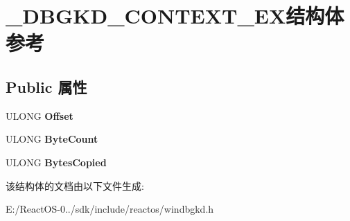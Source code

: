 \hypertarget{struct___d_b_g_k_d___c_o_n_t_e_x_t___e_x}{}\section{\+\_\+\+D\+B\+G\+K\+D\+\_\+\+C\+O\+N\+T\+E\+X\+T\+\_\+\+E\+X结构体 参考}
\label{struct___d_b_g_k_d___c_o_n_t_e_x_t___e_x}
\subsection*{Public 属性}
\begin{DoxyCompactItemize}
\item 
\mbox{\label{struct___d_b_g_k_d___c_o_n_t_e_x_t___e_x_a768a602dd8ec1f9da5944914f9025493}} 
U\+L\+O\+NG {\bfseries Offset}
\item 
\mbox{\label{struct___d_b_g_k_d___c_o_n_t_e_x_t___e_x_a8b64f1d0c819cf7cb286e8c11b83c7a8}} 
U\+L\+O\+NG {\bfseries Byte\+Count}
\item 
\mbox{\label{struct___d_b_g_k_d___c_o_n_t_e_x_t___e_x_a84fb5ac98995f33ffb12a20cf1aa6d1b}} 
U\+L\+O\+NG {\bfseries Bytes\+Copied}
\end{DoxyCompactItemize}


该结构体的文档由以下文件生成\+:\begin{DoxyCompactItemize}
\item 
E\+:/\+React\+O\+S-\/0../sdk/include/reactos/windbgkd.\+h\end{DoxyCompactItemize}
